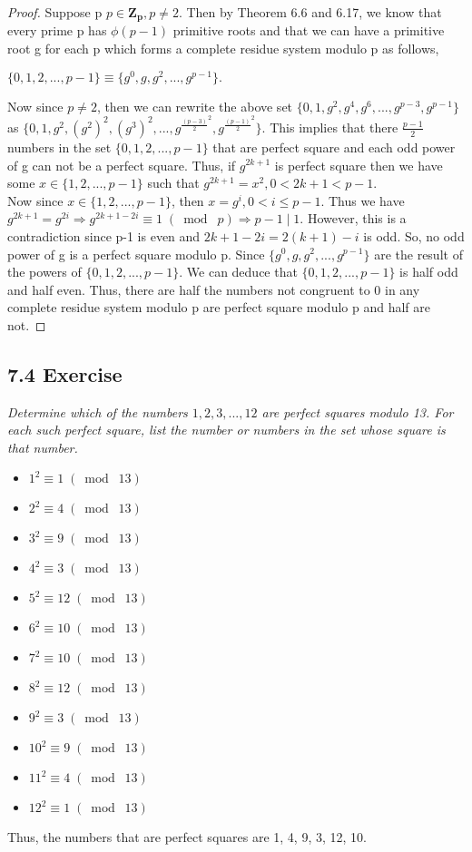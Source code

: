 \documentclass{article}
\begin{document}
\begin{proof}
Suppose p $p \in \mathbf{Z_p}, p \neq 2$. Then by Theorem 6.6 and 6.17, we know that every prime p has $\phi(p-1)$ primitive roots and that we can have a primitive root g for each p which forms a complete residue system modulo p as follows,
\begin{center}
    $\{0, 1, 2,...,p-1\} \equiv \{g^0, g, g^2, ..., g^{p-1}\}.$
\end{center}
Now since $p \neq 2$, then we can rewrite the above set $\{0, 1, g^2, g^4, g^6,..., g^{p-3}, g^{p-1}\}$ as $\{0, 1, g^2, (g^2)^2, (g^3)^2,..., g^{\frac{(p-3)}{2}^2},g^{\frac{(p-1)}{2}^2}\}$. This implies that there $\frac{p-1}{2}$ numbers in the set $\{0, 1, 2,...,p-1\}$ that are perfect square and each odd power of g can not be a perfect square. Thus, if $g^{2k+1}$ is perfect square then we have some $x \in \{1, 2,...,p-1\}$ such that $g^{2k+1} = x^2, 0 < 2k+1<p-1$.\\
Now since $x \in \{1, 2,...,p-1\}$, then $x = g^i, 0 < i \leq p-1$. Thus we have $g^{2k+1} = g^{2i} \Longrightarrow g^{2k+1-2i} \equiv 1 \;(\bmod\; p) \Longrightarrow p-1 \mid 1.$ However, this is a contradiction since p-1 is even and $2k+1-2i = 2(k+1)-i$ is odd. So, no odd power of g is a perfect square modulo p. Since $\{g^0, g, g^2, ..., g^{p-1}\}$ are the result of the powers of $\{0, 1, 2,...,p-1\}$. We can deduce that $\{0, 1, 2,...,p-1\}$ is half odd and half even. Thus, there are half the numbers not congruent to 0 in any complete residue system modulo p are perfect square modulo p and half are not.
\end{proof}

\subsection*{7.4 Exercise} 
\quad \textit{Determine which of the numbers $1,2,3,...,12$ are perfect squares modulo 13. For each such perfect square, list the number or numbers in the set whose square is that number.}

\begin{itemize}
    \item $1^2 \equiv 1 \;(\bmod\; 13)$
    \item $2^2 \equiv 4 \;(\bmod\; 13)$
    \item $3^2 \equiv 9 \;(\bmod\; 13)$
    \item $4^2 \equiv 3 \;(\bmod\; 13)$
    \item $5^2 \equiv 12 \;(\bmod\; 13)$
    \item $6^2 \equiv 10 \;(\bmod\; 13)$
    \item $7^2 \equiv 10 \;(\bmod\; 13)$
    \item $8^2 \equiv 12 \;(\bmod\; 13)$
    \item $9^2 \equiv 3 \;(\bmod\; 13)$
    \item $10^2 \equiv 9 \;(\bmod\; 13)$
    \item $11^2 \equiv 4 \;(\bmod\; 13)$
    \item $12^2 \equiv 1 \;(\bmod\; 13)$
\end{itemize}
Thus, the numbers that are perfect squares are 1, 4, 9, 3, 12, 10. 
\end{document}
